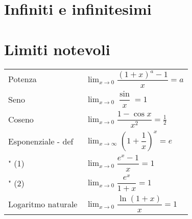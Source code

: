 \section{Infiniti e infinitesimi}

\section{Limiti notevoli}
\begin{center}
\begin{tabular}{ll}
    Potenza            & $\displaystyle\lim_{x \rightarrow 0} \dfrac{(1+x)^a - 1}{x} = a$ \\
    Seno               & $\displaystyle\lim_{x \rightarrow 0} \dfrac{\sin}{x} = 1$ \\
    Coseno             & $\displaystyle\lim_{x \rightarrow 0} \dfrac{1 - \cos x}{x^2} = \frac{1}{2}$ \\
    Esponenziale - def & $\displaystyle\lim_{x \rightarrow \infty} \left( 1 + \dfrac{1}{x} \right)^x = e$ \\
    \qquad " \qquad (1)& $\displaystyle\lim_{x \rightarrow 0} \dfrac{e^x - 1}{x} = 1$ \\
    \qquad " \qquad (2)& $\displaystyle\lim_{x \rightarrow 0} \dfrac{e^{x}}{1+x} = 1$ \\
    Logaritmo naturale & $\displaystyle\lim_{x \rightarrow 0} \dfrac{\ln (1+x)}{x} = 1$ \\
\end{tabular}
\end{center}

